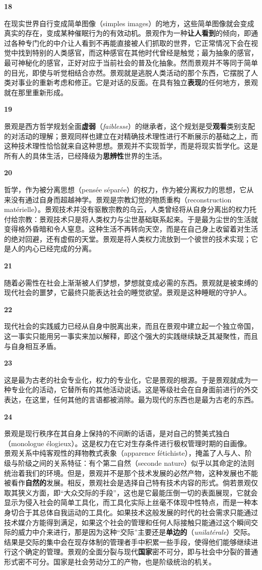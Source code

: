 \documentclass[fontset=fandol, a4paper, 12pt, openright]{ctexbook}
\makeatletter
\newcommand{\thesis}[1]{%
    \par\vspace{1.5em}%
    {\centering \textbf{\Large #1}\par}%
    \nobreak\vspace{0.5em}\nobreak
    \@afterindenttrue %
    \@afterheading    %
}
\makeatother
\begin{document}
\thesis{18}
在现实世界自行变成简单图像（simples images）的地方，这些简单图像就会变成真实的存在，变成某种催眠行为的有效动机。景观作为一种\textbf{让人看到}的倾向，即通过各种专门化的中介让人看到不再能直接被人们抓取的世界，它正常情况下会在视觉中找到特别的人类感官，而这种感官在其他时代曾经是触觉；最为抽象的感官，最可神秘化的感官，正好对应于当前社会的普及化抽象。然而景观并不等同于简单的目光，即使与听觉相结合亦然。景观就是逃脱人类活动的那个东西，它摆脱了人类对事业的重新考虑和修正。它是对话的反面。在具有独立\textbf{表现}的任何地方，景观就在那里重新形成。

\thesis{19}
景观是西方哲学规划全面\textbf{虚弱}（\textit{faiblesse}）的继承者，这个规划是受\textbf{观看}类别支配的对活动的理解；景观同样也建立在对精确技术理性进行不断展示的基础之上，而这种技术理性恰恰就来自这种思想。景观并不实现哲学，而是将现实哲学化。这是所有人的具体生活，已经降级为\textbf{思辨性}世界的生活。

\thesis{20}
哲学，作为被分离思想（pensée séparée）的权力，作为被分离权力的思想，它从来没有通过自身而超越神学。景观是宗教幻觉的物质重构（reconstruction matérielle）。景观技术并没有驱散宗教的乌云，人类曾经将从自身分离出的权力托付给宗教：景观技术只是将人类权力与尘世基础联系起来。于是最为尘世的生活就变得格外昏暗和令人窒息。这种生活不再转向天空，而是在自己身上收留着对生活的绝对回避，还有虚假的天堂。景观是将人类权力流放到一个彼世的技术实现；它是人的内心已经完成的分离。

\thesis{21}
随着必需性在社会上渐渐被人们梦想，梦想就变成必需的东西。景观就是被束缚的现代社会的噩梦，它最终只能表达社会的睡觉欲望。景观是这种睡眠的守护人。

\thesis{22}
现代社会的实践威力已经从自身中脱离出来，而且在景观中建立起一个独立帝国，这一事实只能用另一事实来加以解释，即这个强大的实践继续缺乏其凝聚性，而且与自身相互矛盾。

\thesis{23}
这是最为古老的社会专业化，权力的专业化，它是景观的根源。于是景观就成为一种专业化的活动，它替所有的其他活动说话。这是等级社会在自身面前进行的外交表达，在这里，任何其他的言语都被消除。最为现代的东西也是最为古老的东西。

\thesis{24}
景观是现行秩序在其自身上保持的不间断的话语，是对自己的赞美式独白（monologue élogieux）。这是权力在它对生存条件进行极权管理时期的自画像。景观关系中纯客观性的拜物教式表象（apparence fétichiste），掩盖了人与人、阶级与阶级之间的关系特征：有个第二自然（seconde nature）似乎以其命定的法则统治着我们的环境。但是，景观并不是那个技术发展的必然产物，这种发展也不能被看作\textbf{自然的}发展。相反，景观社会是选择自己特有技术内容的形式。倘若景观仅取其狭义方面，即“大众交际的手段”，这也是它最能压倒一切的表面展现，它就会显示为侵入社会的简单工具化，而工具化实际上丝毫不体现中性特点，而是一种本身切合于其总体自我运动的工具化。如果技术这般发展的时代的社会需求只能通过技术媒介方能得到满足，如果这个社会的管理和任何人际接触只能通过这个瞬间交际的威力中介来进行，那是因为这种“交际”主要还是\textbf{单边的}（\textit{unilatérale}）交际。结果是交际的集中会在现存体制的管理者手中积累一些手段，使得他们能够继续进行这个确定的管理。景观的全面分裂与现代\textbf{国家}密不可分，即与社会中分裂的普通形式密不可分。国家是社会劳动分工的产物，也是阶级统治的机关。
\end{document}
